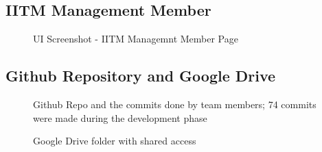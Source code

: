 \subsection{IITM Management Member}
\begin{figure}[H]
    \centering
    \caption{UI Screenshot - IITM Managemnt Member Page}
    \label{fig:ss_i_courses}
\end{figure}

\subsection{Github Repository and Google Drive}
\begin{figure}[H]
    \centering
    \caption{Github Repo and the commits done by team members; 74 commits were made during the development phase}
    \label{fig:ghr}
\end{figure}
\begin{figure}[H]
    \centering
    \caption{Google Drive folder with shared access}
    \label{fig:ghr3}
\end{figure}

